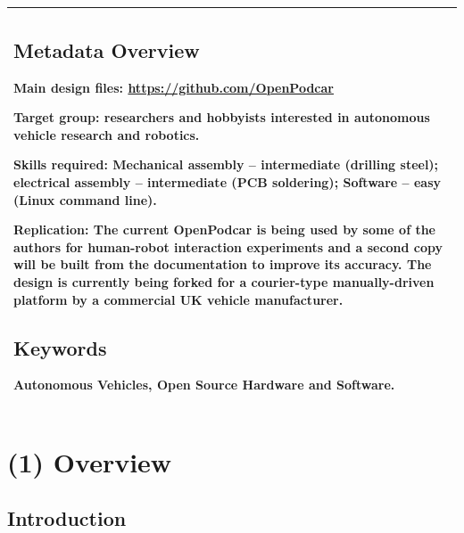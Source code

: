 \documentclass[a4paper]{article}
\begin{document}
	\begin{longtable}[]{@{}l@{}}
		\begin{minipage}[t]{0.97\columnwidth}\raggedright\strut
			
			
			
			\subsection{Metadata Overview}\label{h.akaipbqoqfs8}
			
			Main design files: \url{https://github.com/OpenPodcar}
			
			Target group: researchers and hobbyists interested in autonomous vehicle research and robotics. 
			
			Skills required: Mechanical assembly – intermediate (drilling steel); electrical assembly – intermediate (PCB soldering); Software – easy (Linux command line).
			
			Replication: The current OpenPodcar is being used by some of the authors for human-robot interaction experiments and a second copy will be built from the documentation to improve its accuracy. The design is currently being forked for a courier-type manually-driven platform by a commercial UK vehicle manufacturer. 
			
			
			
			\subsection{Keywords}\label{h.kdz351yp7g7c}
			
			{Autonomous Vehicles, Open Source Hardware and Software.}
			
			\strut\end{minipage}\tabularnewline
		\bottomrule
	\end{longtable}
	
	
	
	\section{(1) Overview}
	
	\subsection{Introduction}
	\label{h.pnj38xyr5dyy}
	
	
	
\end{document}
